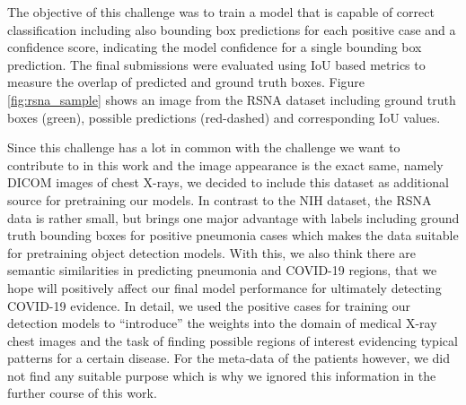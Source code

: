 The objective of this challenge was to train a model that is capable of correct classification including also bounding box predictions for each positive case and a confidence score, indicating the model confidence for a single bounding box prediction. The final submissions were evaluated using \ac{IoU} based metrics to measure the overlap of predicted and ground truth boxes. Figure \ref{fig:rsna_sample} shows an image from the \ac{RSNA} dataset including ground truth boxes (green), possible predictions (red-dashed) and corresponding \ac{IoU} values.

Since this challenge has a lot in common with the challenge we want to contribute to in this work and the image appearance is the exact same, namely DICOM images of chest X-rays, we decided to include this dataset as additional source for pretraining our models. In contrast to the \ac{NIH} dataset, the \ac{RSNA} data is rather small, but brings one major advantage with labels including ground truth bounding boxes for positive pneumonia cases which makes the data suitable for pretraining object detection models. With this, we also think there are semantic similarities in predicting pneumonia and COVID-19 regions, that we hope will positively affect our final model performance for ultimately detecting COVID-19 evidence. In detail, we used the positive cases for training our detection models to \enquote{introduce} the weights into the domain of medical X-ray chest images and the task of finding possible regions of interest evidencing typical patterns for a certain disease. For the meta-data of the patients however, we did not find any suitable purpose which is why we ignored this information in the further course of this work.

